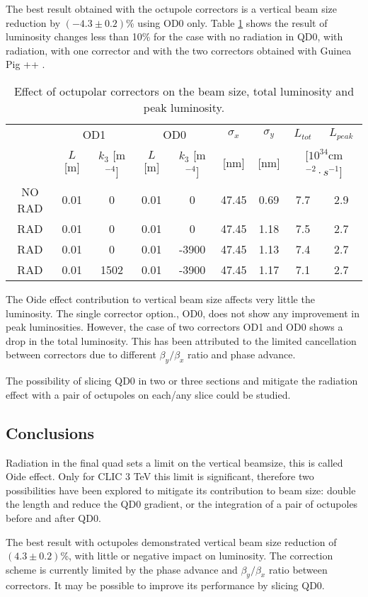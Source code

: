 The best result obtained with the octupole correctors is a vertical beam size reduction by $(-4.3\pm0.2)$\% using OD0 only. Table \ref{t:correctors} shows the result of luminosity changes less than 10\% for the case with no radiation in QD0, with radiation, with one corrector and with the two correctors obtained with Guinea Pig ++ \cite{Schulte:382453}.\par
\begin{table}[!hbt]
\centering
\scriptsize
\begin{tabular}{c||c|c|c|c||c|c||c|c}\hline
& \multicolumn{2}{c|}{OD1} &\multicolumn{2}{c||}{OD0} & $\sigma_x$ & $\sigma_y$ & $L_{tot}$ & $L_{peak}$\\
& $L$ [m] & $k_3$ [m$^{-4}$] & $L$ [m] & $k_3$ [m$^{-4}$] &  [nm] & [nm] & \multicolumn{2}{c}{[$10^{34}$cm$^{-2}\cdot s^{-1}$]}\\\hline\hline
NO RAD & 0.01 & 0 & 0.01 & 0 & 47.45 & 0.69 & 7.7 & 2.9\\
RAD    & 0.01 & 0 & 0.01 & 0 & 47.45 & 1.18 & 7.5 & 2.7 \\
RAD    & 0.01 & 0 & 0.01 & -3900 & 47.45 & 1.13 & 7.4 & 2.7 \\
RAD    & 0.01 & 1502 & 0.01 & -3900 & 47.45 & 1.17 & 7.1 & 2.7 \\\hline
\end{tabular}\caption{Effect of octupolar correctors on the beam size, total luminosity and peak luminosity.}\label{t:correctors}
\end{table}
The Oide effect contribution to vertical beam size affects very little the luminosity. The single corrector option., OD0, does not show any improvement in peak luminosities. However, the case of two correctors OD1 and OD0 shows a drop in the total luminosity. This has been attributed to the limited cancellation between correctors due to different $\beta_y/\beta_x$ ratio and phase advance.\par
The possibility of slicing QD0 in two or three sections and mitigate the radiation effect with a pair of octupoles on each/any slice could be studied.\par
\subsection{Conclusions}
Radiation in the final quad sets a limit on the vertical beamsize, this is called Oide effect. Only for CLIC 3 TeV this limit is significant, therefore two possibilities have been explored to mitigate its contribution to beam size: double the length and reduce the QD0 gradient, or the integration of a pair of octupoles before and after QD0.\par
The best result with octupoles demonstrated vertical beam size reduction of $(4.3\pm0.2)$\%, with little or negative impact on luminosity. The correction scheme is currently limited by the phase advance and $\beta_y/\beta_x$ ratio between correctors. It may be possible to improve its performance by slicing QD0.\par
